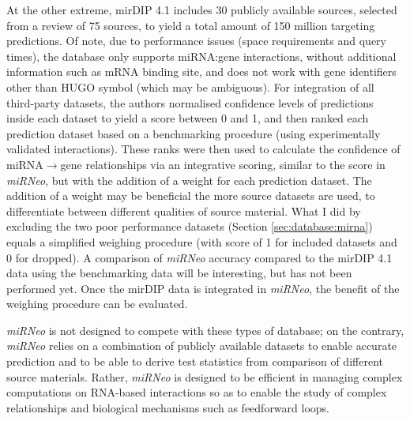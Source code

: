 At the other extreme, mirDIP 4.1 includes 30 publicly available sources, selected from a review of 75 sources, to yield a total amount of 150 million targeting predictions.\cite{Tokar2018} Of note, due to performance issues (space requirements and query times), the database only supports miRNA:gene interactions, without additional information such as mRNA binding site, and does not work with gene identifiers other than HUGO symbol (which may be ambiguous). For integration of all third-party datasets, the authors normalised confidence levels of predictions inside each dataset to yield a score between 0 and 1, and then ranked each prediction dataset based on a benchmarking procedure (using experimentally validated interactions). These ranks were then used to calculate the confidence of miRNA$\to$gene relationships via an integrative scoring, similar to the score in \emph{miRNeo}, but with the addition of a weight for each prediction dataset. The addition of a weight may be beneficial the more source datasets are used, to differentiate between different qualities of source material. What I did by excluding the two poor performance datasets (Section \ref{sec:database:mirna}) equals a simplified weighing procedure (with score of 1 for included datasets and 0 for dropped). A comparison of \emph{miRNeo} accuracy compared to the mirDIP 4.1 data using the benchmarking data will be interesting, but has not been performed yet. Once the mirDIP data is integrated in \emph{miRNeo}, the benefit of the weighing procedure can be evaluated.

\emph{miRNeo} is not designed to compete with these types of database; on the contrary, \emph{miRNeo} relies on a combination of publicly available datasets to enable accurate prediction\cite{Witkos2011} and to be able to derive test statistics from comparison of different source materials. Rather, \emph{miRNeo} is designed to be efficient in managing complex computations on RNA-based interactions so as to enable the study of complex relationships and biological mechanisms such as feedforward loops.

